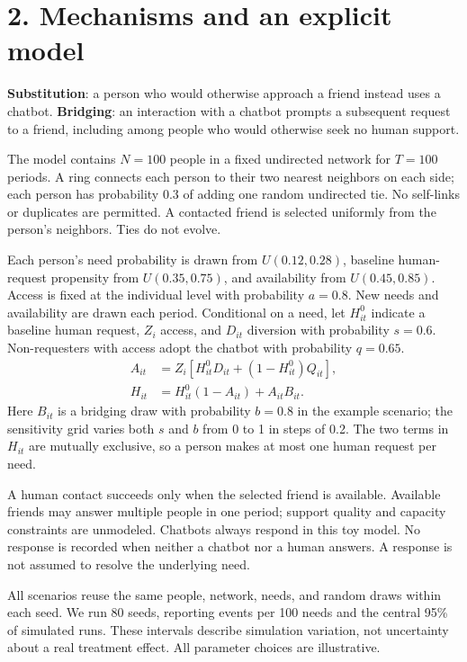 \documentclass[11pt]{article}
\begin{document}
\section*{2. Mechanisms and an explicit model}
\textbf{Substitution}: a person who would otherwise approach a friend instead uses a chatbot. \textbf{Bridging}: an interaction with a chatbot prompts a subsequent request to a friend, including among people who would otherwise seek no human support.

The model contains $N=100$ people in a fixed undirected network for $T=100$ periods. A ring connects each person to their two nearest neighbors on each side; each person has probability 0.3 of adding one random undirected tie. No self-links or duplicates are permitted. A contacted friend is selected uniformly from the person's neighbors. Ties do not evolve.

Each person's need probability is drawn from $U(0.12,0.28)$, baseline human-request propensity from $U(0.35,0.75)$, and availability from $U(0.45,0.85)$. Access is fixed at the individual level with probability $a=0.8$. New needs and availability are drawn each period. Conditional on a need, let $H^0_{it}$ indicate a baseline human request, $Z_i$ access, and $D_{it}$ diversion with probability $s=0.6$. Non-requesters with access adopt the chatbot with probability $q=0.65$.
\begin{align*}
 A_{it}&=Z_i\left[H^0_{it}D_{it}+(1-H^0_{it})Q_{it}\right],\\
 H_{it}&=H^0_{it}(1-A_{it})+A_{it}B_{it}.
\end{align*}
Here $B_{it}$ is a bridging draw with probability $b=0.8$ in the example scenario; the sensitivity grid varies both $s$ and $b$ from 0 to 1 in steps of 0.2. The two terms in $H_{it}$ are mutually exclusive, so a person makes at most one human request per need.

A human contact succeeds only when the selected friend is available. Available friends may answer multiple people in one period; support quality and capacity constraints are unmodeled. Chatbots always respond in this toy model. No response is recorded when neither a chatbot nor a human answers. A response is not assumed to resolve the underlying need.

All scenarios reuse the same people, network, needs, and random draws within each seed. We run 80 seeds, reporting events per 100 needs and the central 95\% of simulated runs. These intervals describe simulation variation, not uncertainty about a real treatment effect. All parameter choices are illustrative.
\newpage
\end{document}

